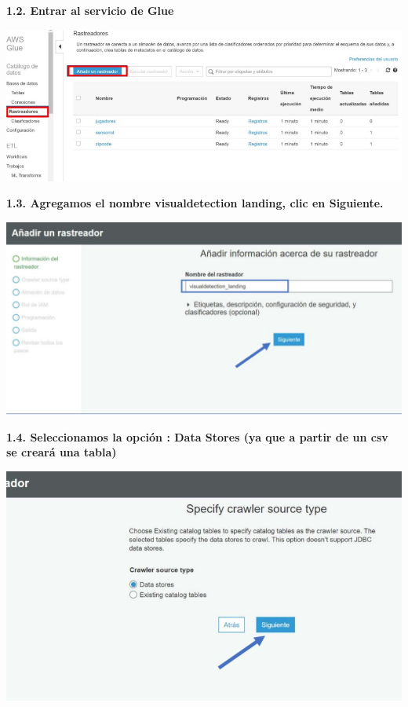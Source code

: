\documentclass{article}
\begin{document}
\textbf{1.2. Entrar al servicio de Glue}


    \begin{center}
		\includegraphics[width=15cm]{./images/2} 
	\end{center}

\textbf{1.3.   Agregamos el nombre visualdetection landing, clic en Siguiente.
}

    \begin{center}
		\includegraphics[width=15cm]{./images/3} 
	\end{center}

\newpage
\textbf{1.4.  Seleccionamos la opción : Data Stores (ya que a partir de un csv se creará una tabla)
}

    \begin{center}
		\includegraphics[width=15cm]{./images/4} 
	\end{center}
	
\end{document}
